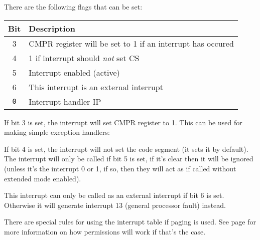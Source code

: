 There are the following flags that can be set:

\singlespacing
\begin{longtable}{|c|p{4.0in}|} \hline
Bit & Description \\ \hline
3 & CMPR register will be set to 1 if an interrupt has occured \\ \hline
4 & 1 if interrupt should \emph{not} set CS \\ \hline
5 & Interrupt enabled (active) \\ \hline
6 & This interrupt is an external interrupt \\ \hline
 \texttt{0} & Interrupt handler IP
\end{longtable}
\onehalfspacing

If bit 3 is set, the interrupt will set CMPR register to 1. This can be used for making simple exception handlers:

If bit 4 is set, the interrupt will not set the code segment (it sets it by default). The interrupt will only be called if bit 5 is set, if it's clear then it will be ignored (unless it's the interrupt 0 or 1, if so, then they will act as if called without extended mode enabled).

This interrupt can only be called as an external interrupt if bit 6 is set. Otherwise it will generate interrupt 13 (general processor fault) instead.

There are special rules for using the interrupt table if paging is used. See page \pageref{interrupthandlingpg} for more information on how permissions will work if that's the case.

